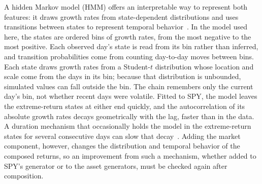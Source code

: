 A hidden Markov model (HMM) offers an interpretable way to represent
both features: it draws growth rates from state-dependent distributions
and uses transitions between states to represent temporal
behavior~\cite{rabinerJuang1986, rydenTerasvirtaAsbrink1998}. In the
model used here, the states are ordered bins of growth rates, from the
most negative to the most positive. Each observed day's state is read
from its bin rather than inferred, and transition probabilities come
from counting day-to-day moves between bins. Each state draws growth
rates from a Student-$t$ distribution whose location and scale come
from the days in its bin; because that distribution is unbounded,
simulated values can fall outside the bin. The chain remembers only the current day's bin, not whether recent
days were volatile. Fitted to SPY, the model leaves
the extreme-return states at either end quickly, and the
autocorrelation of its absolute growth rates decays geometrically with
the lag, faster than in the data. A duration mechanism that
occasionally holds the model in the extreme-return states for several
consecutive days can slow that decay~\cite{bullaBulla2006}. Adding the
market component, however, changes the distribution and temporal
behavior of the composed returns, so an improvement from such a mechanism, whether added to SPY's
generator or to the asset generators, must be checked again after
composition.


